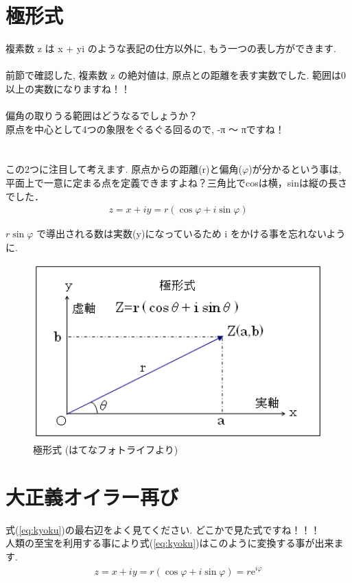 \documentclass[11pt,a4paper]{jreport}
\begin{document}
\section{極形式}
複素数 z は x + yi のような表記の仕方以外に, もう一つの表し方ができます.\\
\\
前節で確認した, 複素数 z の絶対値は, 原点との距離を表す実数でした. 範囲は0以上の実数になりますね！！\\
\\
偏角の取りうる範囲はどうなるでしょうか？\\
原点を中心として4つの象限をぐるぐる回るので, -π ～ πですね！\\
\\
\\
この2つに注目して考えます. 原点からの距離(r)と偏角($\varphi$)が分かるという事は, 平面上で一意に定まる点を定義できますよね？三角比でcosは横，sinは縦の長さでした．
\begin{eqnarray}
z = x + iy = r(\cos \varphi + i\sin \varphi)
\label{eq:kyoku}
\end{eqnarray}

$r\sin\varphi$ で導出される数は実数(y)になっているため i をかける事を忘れないように.\\

\begin{figure}[H]
\label{im:polar}
  \centering
  \includegraphics[width=120mm,bb=0 0 406 246]{figures/polar.png}
  \caption{極形式 (はてなフォトライフより)}
\end{figure}

\section{大正義オイラー再び}
式(\ref{eq:kyoku})の最右辺をよく見てください. どこかで見た式ですね！！！\\
人類の至宝を利用する事により式(\ref{eq:kyoku})はこのように変換する事が出来ます.\\
\begin{eqnarray}
z = x + iy = r(\cos\varphi + i\sin \varphi) = r \mathrm{e}^{i\varphi}
\end{eqnarray}
\end{document}
